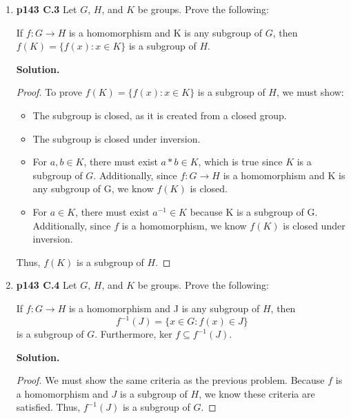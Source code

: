 \documentclass[11pt]{article}
\begin{document}
\begin{enumerate}
	{\bfseries Solution.}
	
	\begin{proof}
	Let $a, b \in G$. The composite 	$(g \circ f)(a*b) = g(f(a*b)) = g(f(a) * f(b)) = g(f(a)) * g(f(b)) = (g \circ f)(a) * (g \circ f)(b)$. Thus, the composite is a homomorphism.
	\end{proof}


\item {\bfseries p143 C.3} Let $G$, $H$, and $K$ be groups. Prove the following:
 
	If $f : G \rightarrow H$ is a homomorphism and K is any subgroup of $G$, then $f(K) = \{f(x) : x \in K\}$ is a subgroup of $H$.
  
	{\bfseries Solution.}
	
	\begin{proof}
	To prove $f(K) = \{f(x) : x \in K\}$ is a subgroup of $H$, we must show:
	\begin{itemize}
		\item The subgroup is closed, as it is created from a closed group.
		\item The subgroup is closed under inversion.
		\item For $a, b \in K$, there must exist $a*b \in K$, which is true since $K$ is a subgroup of $G$. Additionally, since $f : G \rightarrow H$ is a homomorphism and K is any subgroup of G, we know $f(K)$ is closed.
		\item For $a \in K$, there must exist $a^{-1} \in K$ because K is a subgroup of G. Additionally, since $f$ is a homomorphism, we know $f(K)$ is closed under inversion.
	\end{itemize}
	Thus, $f(K)$ is a subgroup of $H$.
	\end{proof}


\item {\bfseries p143 C.4} Let $G$, $H$, and $K$ be groups. Prove the following:
 
	If $f : G \rightarrow H$ is a homomorphism and J is any subgroup of $H$, then
	$$f^{-1}(J) = \{x \in G : f(x) \in J\}$$
	is a subgroup of $G$. Furthermore, ker $f \subseteq f^{-1}(J)$.
  
	{\bfseries Solution.}
	
	\begin{proof}
	We must show the same criteria as the previous problem.
	Because $f$ is a homomorphism and $J$ is a subgroup of $H$, we know these criteria are satisfied.
	Thus, $f^{-1}(J)$ is a subgroup of $G$.
	\end{proof}



\end{enumerate}
\end{document}
